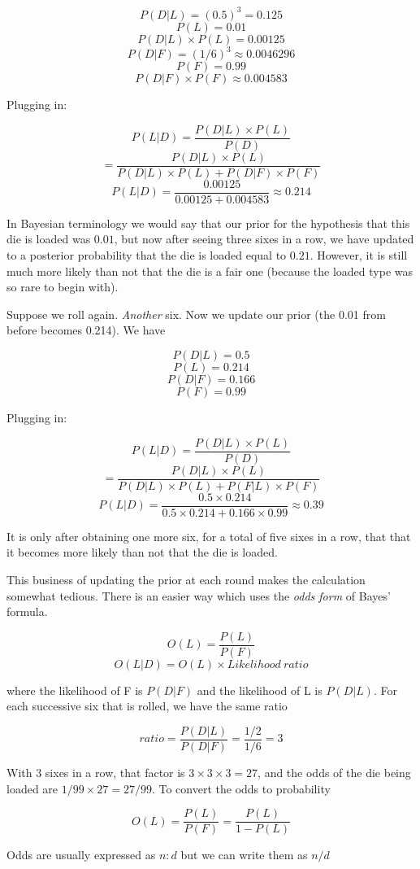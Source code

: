 \documentclass[11pt, oneside]{article}
\begin{document}
\[ P(D|L) = (0.5)^3 = 0.125 \]
\[ P(L) = 0.01 \]
\[ P(D|L) \times P(L) = 0.00125 \]
\[ P(D|F) = (1/6)^3 \approx 0.0046296 \]
\[ P(F) = 0.99 \]
\[ P(D|F) \times P(F) \approx 0.004583 \]

Plugging in:

\[ P(L|D) = \frac{P(D|L) \times P(L)}{P(D)} \]
\[ = \frac{P(D|L) \times P(L)}{P(D|L) \times P(L) + P(D|F) \times P(F)} \]
\[ P(L|D) = \frac{0.00125}{0.00125 + 0.004583} \approx 0.214 \]

In Bayesian terminology we would say that our prior for the hypothesis that this die is loaded was $0.01$, but now after seeing three sixes in a row, we have updated to a posterior probability that the die is loaded equal to $0.21$.  However, it is still much more likely than not that the die is a fair one (because the loaded type was so rare to begin with).  

Suppose we roll again.  \emph{Another} six.  Now we update our prior (the 0.01 from before becomes 0.214).  We have

\[ P(D|L) = 0.5 \]
\[ P(L) = 0.214 \]
\[ P(D|F) = 0.166 \]
\[ P(F) = 0.99 \]

Plugging in:

\[ P(L|D) = \frac{P(D|L) \times P(L)}{P(D)}  \]
\[ = \frac{P(D|L) \times P(L)}{P(D|L) \times P(L) + P(F|L) \times P(F)} \]
\[ P(L|D) = \frac{0.5 \times 0.214}{0.5 \times 0.214 + 0.166 \times 0.99} \approx 0.39 \]

It is only after obtaining one more six, for a total of five sixes in a row, that that it becomes more likely than not that the die is loaded.  

This business of updating the prior at each round makes the calculation somewhat tedious.  There is an easier way which uses the \emph{odds form} of Bayes' formula.

\[ O(L) = \frac{P(L)}{P(F)} \]
\[ O(L|D) = O(L) \times Likelihood\  ratio  \]

where the likelihood of F is $P(D|F)$ and the likelihood of L is $P(D|L)$.  For each successive six that is rolled, we have the same ratio

\[ ratio = \frac{P(D|L)}{P(D|F)} = \frac{1/2}{1/6} =  3 \]

With 3 sixes in a row, that factor is $3 \times 3 \times 3 = 27$, and the odds of the die being loaded are $1/99 \times 27 = 27/99$.  To convert the odds to probability

\[ O(L) = \frac{P(L)}{P(F)} = \frac{P(L)}{1-P(L)} \]

Odds are usually expressed as $n:d$ but we can write them as $n/d$
\end{document}

